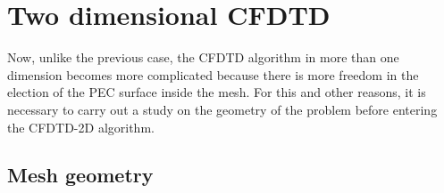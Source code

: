 \documentclass[12pt, oneside]{book}
\begin{document}
\section{Two dimensional CFDTD}

Now, unlike the previous case, the CFDTD algorithm in more than one dimension becomes more complicated because there is more freedom in the election of the PEC surface inside the mesh. For this and other reasons, it is necessary to carry out a study on the geometry of the problem before entering the CFDTD-2D algorithm.

\subsection{Mesh geometry}















\end{document}
